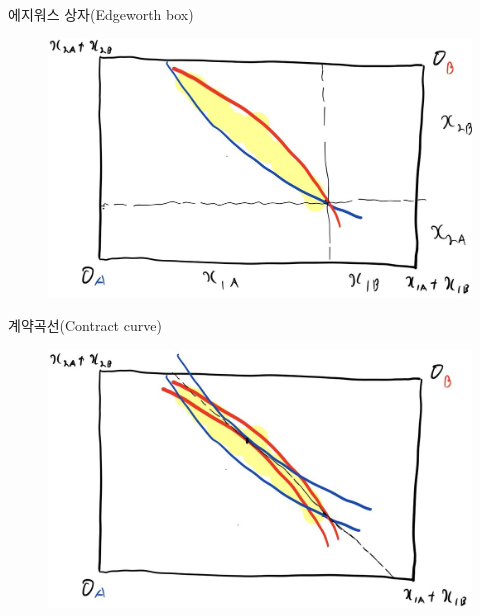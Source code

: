 \documentclass[aspectratio=169,xcolor=dvipsnames,handout]{beamer}
\begin{document}
\begin{frame}{에지워스 상자(Edgeworth box)}
    \begin{figure}
        \centering
        \includegraphics[scale=.3]{pic/box1.jpg}
    \end{figure}
\end{frame}
\begin{frame}{계약곡선(Contract curve)}
    \begin{figure}
        \centering
        \includegraphics[scale=.3]{pic/box2.jpg}
    \end{figure}
\end{frame}
\end{document}
